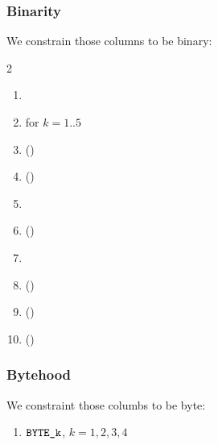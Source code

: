 \subsubsection{Binarity}
We constrain those columns to be binary:
\begin{multicols}{2}
\begin{enumerate}
    \item \lc{}
    \item {} for $k = 1 .. 5$
    \item \phaseEnd{} \quad (\trash)
    \item \done{} \quad (\trash)
    \item {}
    \item \isPrefix{} \quad (\trash)
    \item \ispadding{}
    \item {} \quad (\trash)
    \item \isOt{} \quad (\trash)
    \item \isOd{} \quad (\trash)
\end{enumerate}
\end{multicols}

\subsubsection{Bytehood}
We constraint those columbs to be byte:
\begin{enumerate}
    \item $\texttt{BYTE}\texttt{\_k}$, $k=1,2, 3, 4$
\end{enumerate}

